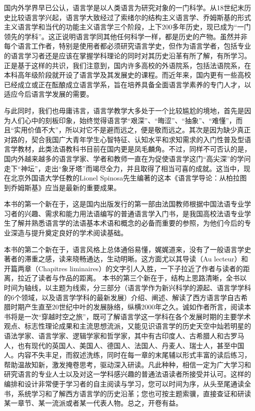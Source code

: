 国内外学界早已公认，语言学是以人类语言为研究对象的一门科学。从18世纪末历史比较语言学兴起，语言学大致经过了索绪尔的结构主义语言学、乔姆斯基的形式主义语言学和当代的功能主义语言学三个阶段，上下200多年历史，现已成为“一门领先的学科”。这正说明语言学同其他任何科学一样，都是历史的产物。虽然并非每个语言工作者，特别是使用者都必须研究语言学史，但作为语言学者，包括专业的语言学习者还是应该在掌握学科理论的同时对其历史沿革有所了解，有所学习。正是基于这样的共识，我们注意到，国内许多高校的外语院系，包括法语院系，在本科高年级阶段就开设了语言学及其发展史的课程。而近年来，国内更有一些高校已经成立或正在酝酿成立语言学系，旨在培养具备全面语言学素养的专门人才，以适应今后语言学发展的需要。

与此同时，我们也毋庸讳言，语言学教学大多处于一个比较尴尬的境地，首先是因为人们心中的刻板印象，始终觉得语言学“艰深”、“晦涩”、“抽象”、“难懂”，而且“实用价值不大”，所以对它不是避而远之，便是敬而远之。其次是因为缺少真正对路的，契合我国广大青年学生心智特征、认知水平和求知需求的入门性普及型语言学教材，此类法语教科书目前在国内更是凤毛麟角。不过，同样不可否认的是，国内外越来越多的语言学家、学者和教师一直在为促使语言学这门“高尖深”的学问走下“神坛”，走出“象牙塔”而竭尽全力，并且取得了相当可喜的成就。这当中，现在北京外国语大学任教的Lionel Spinosa先生编著的这本《语言学导论：从柏拉图到乔姆斯基》应当是最新的重要成果。

本书的第一个新在于，这是国内出版发行的第一部由法国教师根据中国法语专业学习者的兴趣、需求和能力用法语编写的普通语言学入门书，是我国高校法语专业学生了解并熟悉语言学的法语基本术语和概念的必备而重要的参照，为他们今后的专业深造与提升奠定良好的学术阅读基础。

本书的第二个新在于，语言风格上总体通俗易懂，娓娓道来，没有了一般语言学史著者的滞重之感，读来晓畅通达，生动明晰。这方面尤以其导读（Au lecteur）和开篇两章（Chapitres liminaires）的文字引人入胜，一下子拉近了作者与读者的距离，拉近了读者与作品的距离。
本书的第三个新在于，结构上思路清晰，全书以时间为轴线，以主题为线索，分三部分（语言学作为新兴科学的源起、语言学学科的6个领域，以及语言学学科的最新发展）介绍、阐述、解读了西方语言学自古希腊时期产生直至20世纪中叶的发展脉络，纵横2000年之久。诚如作者所言，阅读本书将是一次“穿越时空之旅”，既可了解语言学这一学科在各个发展时期的主要学术观点、标志性理论成果和主流思想流派，又能见识语言学的历史天空中灿若明星的语法学家、语言学家、逻辑学家和哲学家，其中有古印度人、古希腊人和古罗马人，也有现代的英国人、美国人、德国人、法国人、丹麦人、瑞士人，甚至中国人。内容不失丰足，而叙述洗练，同时在每一章的末尾辅以形式丰富的读后练习，帮助温故知新，激发掩卷思考，驱动深入研读。凡此种种，相信一定为广大学习和研究语言的专业人士以及对这一学科感兴趣的普通法语读者所接受并认可。这样的编排和设计非常便于学习者的自主阅读与学习，您可以时间为序，从头至尾通读全书，系统学习和了解西方语言学的历史沿革；您也可按主题索骥，直接查证和研读某一章节、某一流派或者某一代表人物。总之，开卷有益。


